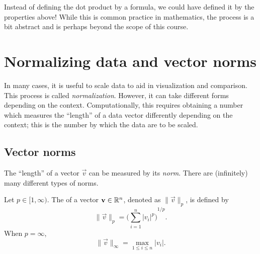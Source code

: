 \documentclass{ximera}
\begin{document}
Instead of defining the dot product by a formula, we could have
defined it by the properties above!  While this is common practice in
mathematics, the process is a bit abstract and is perhaps beyond the
scope of this course.






\section{Normalizing data and vector norms}

In many cases, it is useful to scale data to aid in visualization and
comparison. This process is called \textit{normalization}. However, it
can take different forms depending on the context. Computationally,
this requires obtaining a number which measures the ``length'' of a
data vector differently depending on the context; this is the number
by which the data are to be scaled.



\subsection{Vector norms}

The ``length'' of a vector $\vec{v}$ can be measured by its
\textit{norm}. There are (infinitely) many different types of norms.

\begin{definition}
  Let $p \in [1, \infty)$. The  of a vector
  $\mathbf{v} \in \mathbb{R}^n$, denoted as $\|\vec{v}\|_{p}$, is defined by
  \[
    \|\vec{v}\|_{p}
    = {\biggl( \sum_{i=1}^{n} |v_i|^p \biggr)}^{1/p} .
  \]
  When $p = \infty$,
  \[
    \|\vec{v}\|_{\infty} =\max_{1\le i \le n} |v_i| .
  \]
\end{definition}
\end{document}
